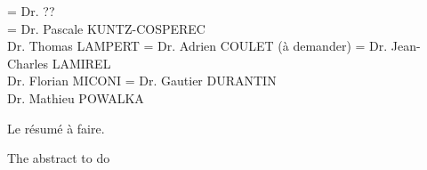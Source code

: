 \documentclass[11pt]{template/thesul}
\begin{document}


\ThesisUL

\President={
    Dr. ??\\
}
\Rapporteurs ={
    Dr. Pascale KUNTZ-COSPEREC\\
    Dr. Thomas LAMPERT
}
\Examinateurs={
    Dr. Adrien COULET (à demander)
}
\Encadrants={
    Dr. Jean-Charles LAMIREL\\
    Dr. Florian MICONI
}
\Invites={
    Dr. Gautier DURANTIN\\
    Dr. Mathieu POWALKA
}

\MakeThesisTitlePage



\NumberAbstractPages
\begin{ThesisAbstract}

    \begin{FrenchAbstract}
        Le résumé à faire.
    \end{FrenchAbstract}

    \begin{EnglishAbstract}
        The abstract to do
    \end{EnglishAbstract}
\end{ThesisAbstract}

\end{document}
